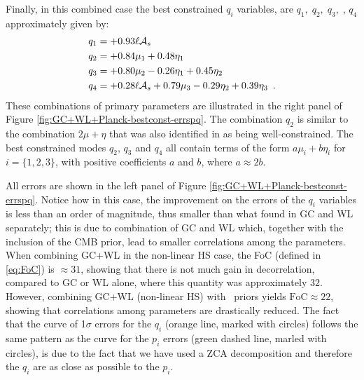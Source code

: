 Finally, in this combined case the best constrained $q_i$ variables, are $q_1,\;q_2,\;q_3,\;$, $q_4$ approximately given by:
\begin{equation} \label{eq:bestCombined-GCWLnonlinPlanck}
\begin{aligned}
	q_1  &= +0.93\ell \mathcal{A}_{s}\\            
	q_2  &= +0.84\mu_1 + 0.48\eta_1 \\ 
	q_3  &= +0.80\mu_2 - 0.26\eta_1 + 0.45 \eta_2\\
	q_4  &= +0.28\ell \mathcal{A}_{s} + 0.79\mu_3 - 0.29 \eta_2 + 0.39 \eta_3 \,\,\, .
\end{aligned}
\end{equation}
These combinations of primary parameters are illustrated in the right panel of Figure \ref{fig:GC+WL+Planck-bestconst-errspq}.
The combination $q_2$ is similar to the combination $2\mu+\eta$ that was also identified in \cite{planck_collaboration_planck_2016} as being well-constrained. The best constrained modes $q_2$, $q_3$ and $q_4$ all contain terms of the form $a\mu_i + b\eta_i$ for $i=\{1,2,3\}$, with positive coefficients $a$ and $b$, where $a \approx 2b$.

All errors are shown in the left panel of Figure \ref{fig:GC+WL+Planck-bestconst-errspq}. Notice how in this case, the improvement on the errors of the $q_i$ variables is less than an order of magnitude, thus smaller than what found in GC and WL separately; this is due to combination of GC and WL which, together with the inclusion of the CMB prior, lead to smaller correlations among the parameters. 
When combining GC+WL in the non-linear HS case, the FoC (defined in \ref{eq:FoC}) is $\approx 31$, 
showing that there is not much gain in decorrelation, compared to GC or WL alone, where this quantity was approximately $32$.
However, combining GC+WL (non-linear HS) with \planck\ priors yields $\textrm{FoC} \approx 22$, showing that correlations among
parameters are drastically reduced.
The fact that the curve of 1$\sigma$ errors for the $q_i$ (orange line, marked with circles) 
follows the same pattern as the curve for the $p_i$ errors (green dashed line, marled with circles), 
is due to the fact that we have used a ZCA decomposition and therefore the $q_i$ are as close as possible to the $p_i$.


